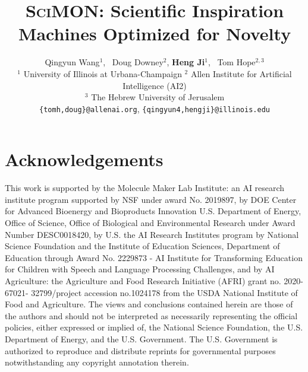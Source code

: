 \documentclass[11pt]{article}
\title{\textsc{SciMON}\testtube: Scientific Inspiration Machines Optimized for Novelty}
\author{
Qingyun Wang$^{1}$, \  Doug Downey$^{2}$,  \textbf{Heng Ji}$^{1}$, \ Tom Hope$^{2,3}$ \\   
$^{1}$ University of Illinois at Urbana-Champaign $^{2}$ Allen Institute for Artificial Intelligence (AI2) \\  $^{3}$ The Hebrew University of Jerusalem  \\
\texttt{\fontfamily{pcr}\selectfont \{tomh,doug\}@allenai.org},
\texttt{\fontfamily{pcr}\selectfont\{qingyun4,hengji\}@illinois.edu}\\
}
\begin{document}
\maketitle











\section*{Acknowledgements}
 This work is supported by the Molecule Maker Lab Institute: an AI research institute program supported by NSF under award No. 2019897, by DOE Center for Advanced Bioenergy and Bioproducts Innovation U.S. Department of Energy, Office of Science, Office of Biological and Environmental Research under Award Number DESC0018420, by U.S. the AI Research Institutes program by National Science Foundation and the Institute of Education Sciences, Department of Education through Award No. 2229873 - AI Institute for Transforming Education for Children with Speech and Language Processing Challenges, and by AI Agriculture: the Agriculture and Food Research Initiative (AFRI) grant no. 2020-67021- 32799/project accession no.1024178 from the USDA National Institute of Food and Agriculture. The views and conclusions contained herein are those of the authors and should not be interpreted as necessarily representing the official policies, either expressed or implied of, the National Science Foundation, the U.S. Department of Energy, and the U.S. Government. The U.S. Government is authorized to reproduce and distribute reprints for governmental purposes notwithstanding any copyright annotation therein.



\end{document}
